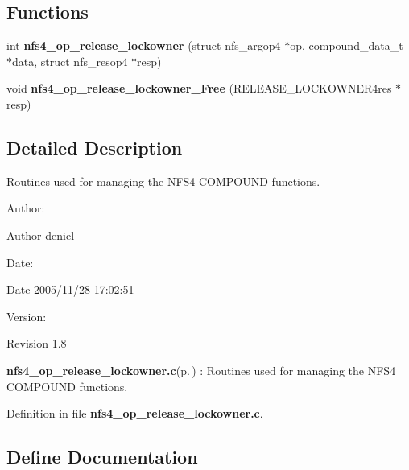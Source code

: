 \subsection*{Functions}
\begin{CompactItemize}
\item 
int {\bf nfs4\_\-op\_\-release\_\-lockowner} (struct nfs\_\-argop4 $\ast$op, compound\_\-data\_\-t $\ast$data, struct nfs\_\-resop4 $\ast$resp)
\item 
void {\bf nfs4\_\-op\_\-release\_\-lockowner\_\-Free} (RELEASE\_\-LOCKOWNER4res $\ast$resp)
\end{CompactItemize}


\subsection{Detailed Description}
Routines used for managing the NFS4 COMPOUND functions. 

\begin{Desc}
\item[Author:]\begin{Desc}
\item[Author]deniel \end{Desc}
\end{Desc}
\begin{Desc}
\item[Date:]\begin{Desc}
\item[Date]2005/11/28 17:02:51 \end{Desc}
\end{Desc}
\begin{Desc}
\item[Version:]\begin{Desc}
\item[Revision]1.8 \end{Desc}
\end{Desc}
{\bf nfs4\_\-op\_\-release\_\-lockowner.c}{\rm (p.\,\pageref{nfs4__op__release__lockowner_8c})} : Routines used for managing the NFS4 COMPOUND functions.

Definition in file {\bf nfs4\_\-op\_\-release\_\-lockowner.c}.

\subsection{Define Documentation}
